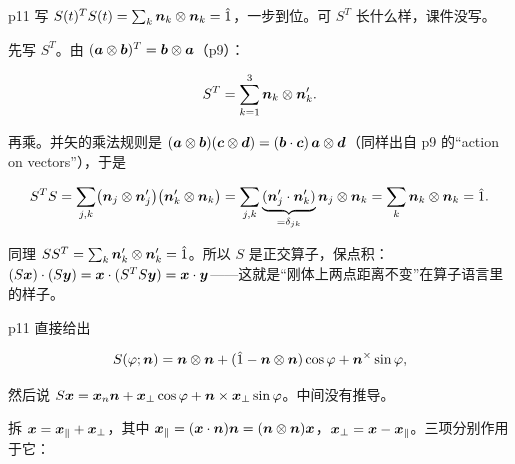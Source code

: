 \documentclass[11pt]{ctexart}
\begin{document}

p11 写 $S(t)^{T}S(t)=\sum_k \boldsymbol{n}_k\otimes\boldsymbol{n}_k=\hat{1}$，一步到位。可 $S^{T}$ 长什么样，课件没写。


先写 $S^{T}$。由 $(\boldsymbol{a}\otimes\boldsymbol{b})^{T}=\boldsymbol{b}\otimes\boldsymbol{a}$（p9）：

\[
S^{T}=\sum_{k=1}^{3}\boldsymbol{n}_k\otimes\boldsymbol{n}'_k .
\]

再乘。并矢的乘法规则是 $(\boldsymbol{a}\otimes\boldsymbol{b})(\boldsymbol{c}\otimes\boldsymbol{d})=(\boldsymbol{b}\cdot\boldsymbol{c})\,\boldsymbol{a}\otimes\boldsymbol{d}$（同样出自 p9 的“action on vectors”），于是

\[
S^{T}S=\sum_{j,k}\bigl(\boldsymbol{n}_j\otimes\boldsymbol{n}'_j\bigr)
\bigl(\boldsymbol{n}'_k\otimes\boldsymbol{n}_k\bigr)
=\sum_{j,k}\underbrace{(\boldsymbol{n}'_j\cdot\boldsymbol{n}'_k)}_{=\delta_{jk}}\boldsymbol{n}_j\otimes\boldsymbol{n}_k
=\sum_{k}\boldsymbol{n}_k\otimes\boldsymbol{n}_k=\hat{1}.
\]


同理 $SS^{T}=\sum_k\boldsymbol{n}'_k\otimes\boldsymbol{n}'_k=\hat{1}$。所以 $S$ 是正交算子，保点积：$(S\boldsymbol{x})\cdot(S\boldsymbol{y})=\boldsymbol{x}\cdot(S^{T}S\boldsymbol{y})=\boldsymbol{x}\cdot\boldsymbol{y}$——这就是“刚体上两点距离不变”在算子语言里的样子。


p11 直接给出

\[
S(\varphi;\boldsymbol{n})=\boldsymbol{n}\otimes\boldsymbol{n}
+(\hat{1}-\boldsymbol{n}\otimes\boldsymbol{n})\cos\varphi
+\boldsymbol{n}^{\times}\sin\varphi ,
\]

然后说 $S\boldsymbol{x}=\boldsymbol{x}_n\boldsymbol{n}+\boldsymbol{x}_\perp\cos\varphi+\boldsymbol{n}\times\boldsymbol{x}_\perp\sin\varphi$。中间没有推导。


拆 $\boldsymbol{x}=\boldsymbol{x}_\parallel+\boldsymbol{x}_\perp$，其中 $\boldsymbol{x}_\parallel=(\boldsymbol{x}\cdot\boldsymbol{n})\boldsymbol{n}=(\boldsymbol{n}\otimes\boldsymbol{n})\boldsymbol{x}$，$\boldsymbol{x}_\perp=\boldsymbol{x}-\boldsymbol{x}_\parallel$。三项分别作用于它：
\end{document}
